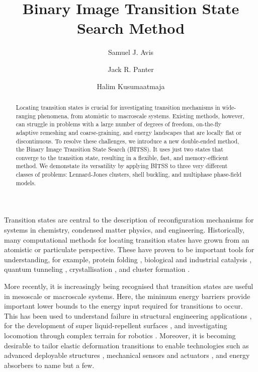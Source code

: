 \documentclass[aps,prl,twocolumn,10pt,groupedaddress]{revtex4-2}
\begin{document}
\title{Binary Image Transition State Search Method}
\author{Samuel J. Avis}
\author{Jack R. Panter}
\author{Halim Kusumaatmaja}

\begin{abstract}
  Locating transition states is crucial for investigating transition mechanisms in wide-ranging phenomena, from atomistic to macroscale systems.
  Existing methods, however, can struggle in problems with a large number of degrees of freedom, on-the-fly adaptive remeshing and coarse-graining, and energy landscapes that are locally flat or discontinuous.
  To resolve these challenges, we introduce a new double-ended method, the Binary Image Transition State Search (BITSS).
  It uses just two states that converge to the transition state, resulting in a flexible, fast, and memory-efficient method.
  We demonstate its versatility by applying BITSS to three very different classes of problems: Lennard-Jones clusters, shell buckling, and multiphase phase-field models.
\end{abstract}

\maketitle


Transition states are central to the description of reconfiguration mechanisms for systems in chemistry, condensed matter physics, and engineering.
Historically, many computational methods for locating transition states have grown from an atomistic or particulate perspective.
These have proven to be important tools for understanding, for example, protein folding \cite{Bryngelson1995,Onuchic1997}, biological and industrial catalysis \cite{Boehr2006,Kerns2015,Guo2018a}, quantum tunneling \cite{Richardson2016,Vaillant2019}, crystallisation \cite{Richard2018}, and cluster formation \cite{Wales1998,Wales2012}.

More recently, it is increasingly being recognised that transition states are useful in mesoscale or macroscale systems.
Here, the minimum energy barriers provide important lower bounds to the energy input required for transitions to occur.
This has been used to understand failure in structural engineering applications \cite{Panter2019,Hutchinson2018}, for the development of super liquid-repellent surfaces \cite{Zhang2014,Panter2019b}, and investigating locomotion through complex terrain for robotics \cite{Othayoth2020}.
Moreover, it is becoming desirable to tailor elastic deformation transitions to enable technologies such as advanced deployable structures \cite{Filipov2015,Zhai2018}, mechanical sensors and actuators \cite{Bertoldi2017,Truby2016,Chi2022,Bonfanti2020}, and energy absorbers \cite{Shan2015,Giri2021} to name but a few.
\end{document}
